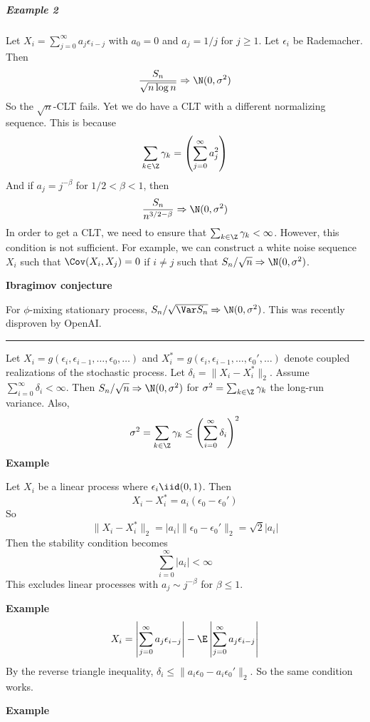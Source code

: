 \subparagraph{Example 2}

Let \(X_i = \sum_{j=0}^\infty a_j \epsilon_{i-j}\) with \(a_0 = 0\) and \(a_j = 1/j\) for \(j \geq 1\). Let \(\epsilon_i\) be Rademacher. Then
\[\frac{S_n}{\sqrt{n \log n}} \Rightarrow \N(0, \sigma^2)\]
So the \(\sqrt n\)-CLT fails. Yet we do have a CLT with a different normalizing sequence. This is because
\[\sum_{k \in \Z} \gamma_k = \left( \sum_{j=0}^\infty a_j^2 \right)\]
And if \(a_j = j^{-\beta}\) for \(1/2 < \beta < 1\), then
\[\frac{S_n}{n^{3/2 - \beta}} \Rightarrow \N(0, \sigma^2)\]
In order to get a CLT, we need to ensure that \(\sum_{k \in \Z} \gamma_k < \infty\). However, this condition is not sufficient. For example, we can construct a white noise sequence \(X_i\) such that \(\Cov(X_i, X_j) = 0\) if \(i \neq j\) such that \(S_n / \sqrt{n} \Rightarrow \N(0, \sigma^2)\).

\textbf{Ibragimov conjecture}

For \(\phi\)-mixing stationary process, \(S_n / \sqrt{ \Var S_n } \Rightarrow \N(0, \sigma^2)\). This was recently disproven by OpenAI.

\begin{center}\rule{0.5\linewidth}{0.5pt}\end{center}

Let \(X_i = g(\epsilon_i, \epsilon_{i-1}, \dots, \epsilon_0, \dots)\) and \(X_i^* = g(\epsilon_i, \epsilon_{i-1}, \dots, \epsilon_0', \dots)\) denote coupled realizations of the stochastic process. Let \(\delta_i = \|X_i - X_i^*\|_2\). Assume \(\sum_{i=0}^\infty \delta_i < \infty\). Then \(S_n/\sqrt{n} \Rightarrow \N(0, \sigma^2)\) for \(\sigma^2 = \sum_{k \in \Z} \gamma_k\) the long-run variance. Also,
\[\sigma^2 = \sum_{k \in \Z} \gamma_k \leq \left( \sum_{i=0}^\infty \delta_i \right)^2\]
\textbf{Example}

Let \(X_i\) be a linear process where \(\epsilon_i \iid (0, 1)\). Then
\[X_i - X_i^* = a_i(\epsilon_0 - \epsilon_0')\]
So
\[\|X_i - X_i^*\|_2 = |a_i| \|\epsilon_0 - \epsilon_0'\|_2 = \sqrt{2}|a_i|\]
Then the stability condition becomes
\[\sum_{i=0}^\infty |a_i| < \infty\]
This excludes linear processes with \(a_j \sim j^{-\beta}\) for \(\beta \leq 1\).

\textbf{Example}
\[X_i = \left| \sum_{j=0}^\infty a_j \epsilon_{i-j} \right| - \E \left| \sum_{j=0}^\infty a_j \epsilon_{i-j} \right|\]
By the reverse triangle inequality, \(\delta_i \leq \|a_i \epsilon_0 - a_i \epsilon_0'\|_2\). So the same condition works.

\textbf{Example}

